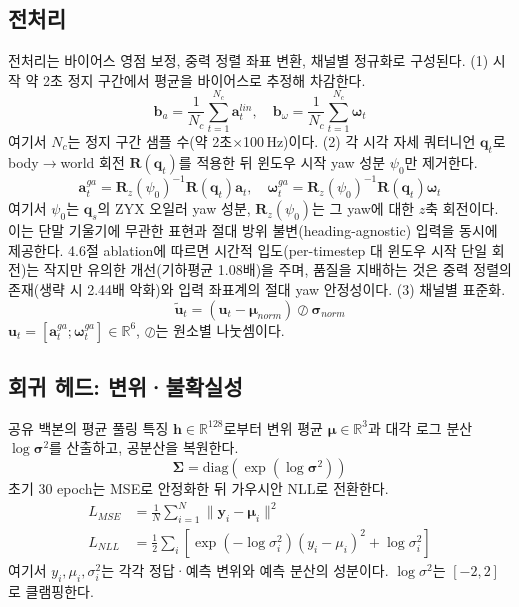 \documentclass[10pt,twocolumn,a4paper]{article}
\begin{document}
\subsection{전처리}
전처리는 바이어스 영점 보정, 중력 정렬 좌표 변환, 채널별 정규화로 구성된다. (1) 시작 약 2초 정지 구간에서 평균을 바이어스로 추정해 차감한다.
\begin{equation}
\mathbf{b}_a=\frac{1}{N_c}\sum_{t=1}^{N_c}\mathbf{a}^{lin}_t,\quad
\mathbf{b}_\omega=\frac{1}{N_c}\sum_{t=1}^{N_c}\bm{\omega}_t
\end{equation}
여기서 $N_c$는 정지 구간 샘플 수(약 2초$\times$100\,Hz)이다. (2) 각 시각 자세 쿼터니언 $\mathbf{q}_t$로 body$\to$world 회전 $\mathbf{R}(\mathbf{q}_t)$를 적용한 뒤 윈도우 시작 yaw 성분 $\psi_0$만 제거한다.
\begin{equation}
\mathbf{a}^{ga}_t=\mathbf{R}_z(\psi_0)^{-1}\mathbf{R}(\mathbf{q}_t)\mathbf{a}_t,\quad
\bm{\omega}^{ga}_t=\mathbf{R}_z(\psi_0)^{-1}\mathbf{R}(\mathbf{q}_t)\bm{\omega}_t
\end{equation}
여기서 $\psi_0$는 $\mathbf{q}_s$의 ZYX 오일러 yaw 성분, $\mathbf{R}_z(\psi_0)$는 그 yaw에 대한 $z$축 회전이다. 이는 단말 기울기에 무관한 표현과 절대 방위 불변(heading-agnostic) 입력을 동시에 제공한다. 4.6절 ablation에 따르면 시간적 입도(per-timestep 대 윈도우 시작 단일 회전)는 작지만 유의한 개선(기하평균 1.08배)을 주며, 품질을 지배하는 것은 중력 정렬의 존재(생략 시 2.44배 악화)와 입력 좌표계의 절대 yaw 안정성이다. (3) 채널별 표준화.
\begin{equation}
\tilde{\mathbf{u}}_t=(\mathbf{u}_t-\bm{\mu}_{norm})\oslash\bm{\sigma}_{norm}
\end{equation}
$\mathbf{u}_t=[\mathbf{a}^{ga}_t;\bm{\omega}^{ga}_t]\in\mathbb{R}^6$, $\oslash$는 원소별 나눗셈이다.

\subsection{회귀 헤드: 변위·불확실성}
공유 백본의 평균 풀링 특징 $\mathbf{h}\in\mathbb{R}^{128}$로부터 변위 평균 $\bm{\mu}\in\mathbb{R}^3$과 대각 로그 분산 $\log\bm{\sigma}^2$를 산출하고, 공분산을 복원한다.
\begin{equation}
\bm{\Sigma}=\mathrm{diag}\!\left(\exp(\log\bm{\sigma}^2)\right)
\end{equation}
초기 30 epoch는 MSE로 안정화한 뒤 가우시안 NLL로 전환한다.
\begin{align}
L_{MSE}&=\frac{1}{N}\sum_{i=1}^{N}\lVert\mathbf{y}_i-\bm{\mu}_i\rVert^2\\
L_{NLL}&=\frac{1}{2}\sum_i\!\left[\exp(-\log\sigma_i^2)(y_i-\mu_i)^2+\log\sigma_i^2\right]
\end{align}
여기서 $y_i,\mu_i,\sigma_i^2$는 각각 정답·예측 변위와 예측 분산의 성분이다. $\log\sigma^2$는 $[-2,2]$로 클램핑한다.
\end{document}
